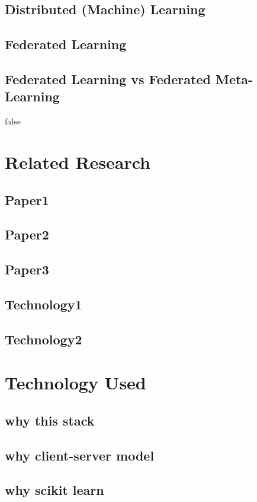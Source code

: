 \subsection*{Distributed (Machine) Learning}

\subsection*{Federated Learning}

\subsection{Federated Learning vs Federated Meta-Learning}


\if false

\section{Related Research}

\subsection{Paper1}
\subsection{Paper2}
\subsection{Paper3}
\subsection{Technology1}
\subsection{Technology2}

\section{Technology Used}
\subsection{why this stack}
\subsection{why client-server model}
\subsection{why scikit learn}

\fi


